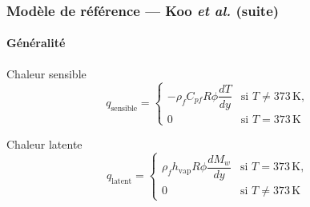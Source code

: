 \documentclass[handout]{beamer}
\newtheorem{pbm et hypo}[thm]{Problématique et hypothèses}
\begin{document}
	\begin{frame}
			\frametitle{\textbf{Modèle de référence — Koo \textit{et al.} (suite)}}
				\framesubtitle{\textbf{Généralité}}
			\begin{block}{Chaleur sensible}
			\begin{equation}
				q_{\text{sensible}} = 
				\begin{cases}
					-\rho_f C_{pf} R \phi \dfrac{dT}{dy} & \text{si } T \neq 373\,\mathrm{K}, \\
					0 & \text{si } T = 373\,\mathrm{K}
				\end{cases}
			\end{equation}
		\end{block}\pause
		\vspace{0.3cm}
		\begin{block}{Chaleur latente}
			\begin{equation}
				q_{\text{latent}} = 
				\begin{cases}
					\rho_f h_{\text{vap}} R \phi \dfrac{dM_w}{dy} & \text{si } T = 373\,\mathrm{K}, \\
					0 & \text{si } T \neq 373\,\mathrm{K}
				\end{cases}
			\end{equation}
		\end{block}
	\end{frame}
	
\end{document}
